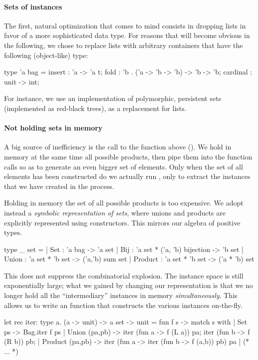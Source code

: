 \paragraph{Sets of instances}
The first, natural optimization that comes to mind consists in
dropping lists in favor of a more sophisticated data type. For reasons
that will become obvious in the following, we chose to replace lists
with arbitrary containers that have the following (object-like) type:
\begin{ocamlcode}
type 'a bag = {
  insert : 'a -> 'a t;
  fold : 'b . ('a -> 'b -> 'b) -> 'b -> 'b;
  cardinal : unit -> int; }
\end{ocamlcode}
For instance, we use an implementation of polymorphic, persistent sets
(implemented as red-black trees), as a replacement for lists.

\paragraph{Not holding sets in memory}
A big source of inefficiency is the call to the
 function above (). We hold in memory
at the same time all possible products, then pipe them into the function calls
so as to generate an even bigger set of elements. Only when the set of all
elements has been constructed do we actually run , only to
extract the instances that we have created in the process.

Holding in memory the set of all possible products is too expensive. We adopt
instead a \emph{symbolic representation of sets}, where unions and products are
explicitly represented using constructors. This mirrors our algebra of positive
types.
%
\begin{ocamlcode}
type _ set =
  | Set   : 'a bag -> 'a set
  | Bij   : 'a set * ('a, 'b) bijection -> 'b set
  | Union   : 'a set * 'b set -> ('a,'b) sum set
  | Product : 'a set * 'b set -> ('a * 'b) set
\end{ocamlcode}
%
This does not suppress the combinatorial explosion. The instance space is still
exponentially large; what we gained by changing our representation is that we
no longer hold all the ``intermediary'' instances in memory
\emph{simultaneously}. This allows us to write an  function that
constructs the various instances on-the-fly.
%
\begin{ocamlcode}
let rec iter: type a. (a -> unit) -> a set -> unit =
fun f s -> match s with
  | Set ps ->
      Bag.iter f ps
  | Union (pa,pb) ->
      iter (fun a -> f (L a)) pa;
      iter (fun b -> f (R b)) pb;
  | Product (pa,pb) ->
      iter (fun a -> iter (fun b -> f (a,b)) pb) pa
  | (* ... *)
\end{ocamlcode}
%

